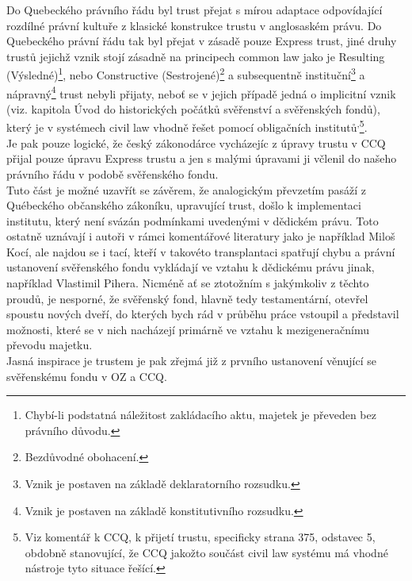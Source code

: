 \documentclass{article}
\begin{document}
Do Quebeckého právního řádu byl trust přejat s mírou adaptace odpovídající rozdílné právní kultuře z klasické konstrukce trustu v anglosaském právu. Do Quebeckého právní řádu tak byl přejat v zásadě pouze Express trust, jiné druhy trustů jejichž vznik stojí zásadně na principech common law jako je Resulting (Výsledné)\footnote{Chybí-li podstatná náležitost zakládacího aktu, majetek je převeden bez právního důvodu.}, nebo Constructive (Sestrojené)\footnote{Bezdůvodné obohacení.} a subsequentně instituční\footnote{Vznik je postaven na základě deklaratorního rozsudku.} a nápravný\footnote{Vznik je postaven na základě konstitutivního rozsudku.} trust nebyli přijaty, neboť se v jejich případě jedná o implicitní vznik (viz. kapitola Úvod do historických počátků svěřenství a svěřenských fondů), který je v systémech civil law vhodně řešet pomocí obligačních institutů\textsuperscript{,}\footnote{Viz komentář k CCQ, k přijetí trustu, specificky strana 375, odstavec 5, obdobně stanovující, že CCQ jakožto součást civil law systému má vhodné nástroje tyto situace řešící.}.\\

Je pak pouze logické, že český zákonodárce vycházejíc z úpravy trustu v CCQ přijal pouze úpravu Express trustu a jen s malými úpravami ji včlenil do našeho právního řádu v podobě svěřenského fondu.\\

Tuto část je možné uzavřít se závěrem, že analogickým převzetím pasáží z Québeckého občanského zákoníku, upravující trust, došlo k implementaci institutu, který není svázán podmínkami uvedenými v dědickém právu. Toto ostatně uznávají i autoři v rámci komentářové literatury jako je například Miloš Kocí, ale najdou se i tací, kteří v takovéto transplantaci spatřují chybu a právní ustanovení svěřenského fondu vykládají ve vztahu k dědickému právu jinak, například Vlastimil Pihera. Nicméně ať se ztotožním s jakýmkoliv z těchto proudů, je nesporné, že svěřenský fond, hlavně tedy testamentární, otevřel spoustu nových dveří, do kterých bych rád v průběhu práce vstoupil a představil možnosti, které se v nich nacházejí primárně ve vztahu k mezigeneračnímu převodu majetku.\\

Jasná inspirace je trustem je pak zřejmá již z prvního ustanovení věnující se svěřenskému fondu v OZ a CCQ.\\
\end{document}

